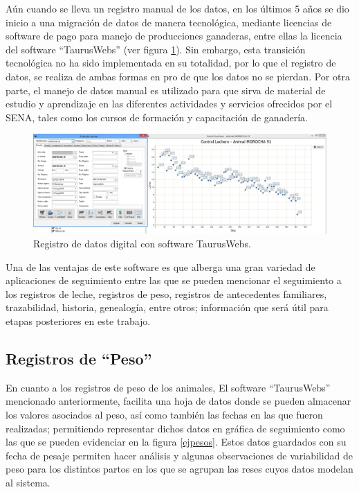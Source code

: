 Aún cuando se lleva un registro manual de los datos, en los últimos 5 años se dio inicio a una migración de datos de manera tecnológica, mediante licencias de software de pago para manejo de producciones ganaderas, entre ellas la licencia del software ``TaurusWebs'' (ver figura \ref{tauruspng}). Sin embargo, esta transición tecnológica no ha sido implementada en su totalidad, por lo que el registro de datos, se realiza de ambas formas en pro de que los datos no se pierdan. Por otra parte, el manejo de datos manual es utilizado para que sirva de material de estudio y aprendizaje en las diferentes actividades y servicios ofrecidos por el SENA, tales como los cursos de formación y capacitación de ganadería.

\begin{figure}[H]
	 \begin{center}
	 \includegraphics[scale=0.345]{img/ejtaurus.jpg}
	 \end{center}
	 \caption{Registro de datos digital con software TaurusWebs. \label{tauruspng}}
\end{figure}

Una de las ventajas de este software es que alberga una gran variedad de aplicaciones de seguimiento entre las que se pueden mencionar el seguimiento a los registros de leche, registros de peso, registros de antecedentes familiares, trazabilidad, historia, genealogía, entre otros; información que será útil para etapas posteriores en este trabajo.

\subsection{Registros de ``Peso''}

En cuanto a los registros de peso de los animales, El software ``TaurusWebs'' mencionado anteriormente, facilita una hoja de datos donde se pueden almacenar los valores asociados al peso, así como también las fechas en las que fueron realizadas; permitiendo representar dichos datos en gráfica de seguimiento como las que se pueden evidenciar  en la figura \ref{ejpesos}. Estos datos guardados con su fecha de pesaje permiten hacer análisis y algunas observaciones de variabilidad de peso para los distintos partos en los que se agrupan las reses cuyos datos modelan al sistema.

